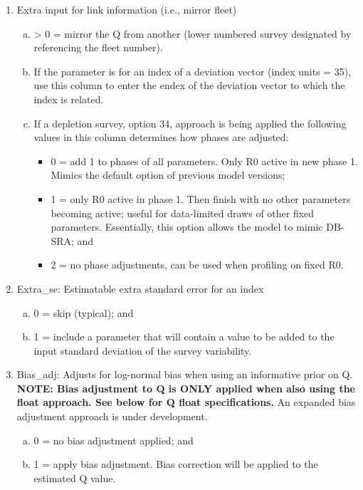 \begin{enumerate}
\begin{enumerate}[(a)]
	\end{enumerate}
	\item \hypertarget{link_info}{Extra input for link information (i.e., mirror fleet)}
	\begin{enumerate}[(a)]
		\item > 0 = mirror the Q from another (lower numbered survey designated by referencing the fleet number).
		\item If the parameter is for an index of a deviation vector (index units = 35), use this column to enter the endex of the deviation vector to which the index is related. 
		\item If a depletion survey, option 34, approach is being applied the following values in this column determines how phases are adjusted:
		\begin{itemize}
			\item 0 = add 1 to phases of all parameters. Only R0 active in new phase 1. Mimics the default option of previous model versions;
			\item 1 = only R0 active in phase 1. Then finish with no other parameters becoming active; useful for data-limited draws of other fixed parameters. Essentially, this option allows the model to mimic DB-SRA; and
			\item 2 = no phase adjustments, can be used when profiling on fixed R0.
		\end{itemize}
	\end{enumerate}
	\item Extra\_se: Estimatable extra standard error for an index
	\begin{enumerate}[(a)]
		\item 0 = skip (typical); and
		\item 1 = include a parameter that will contain a value to be added to the input standard deviation of the survey variability.
	\end{enumerate}
	\item Bias\_adj: Adjusts for log-normal bias when using an informative prior on Q. \textbf{NOTE: Bias adjustment to Q is ONLY applied when also using the float approach. See below for Q float specifications.} An expanded bias adjustment approach is under development.
	\begin{enumerate}[(a)]
		\item 0 = no bias adjustment applied; and
		\item 1 = apply bias adjustment. Bias correction will be applied to the estimated Q value.
	\end{enumerate}

\end{enumerate}
